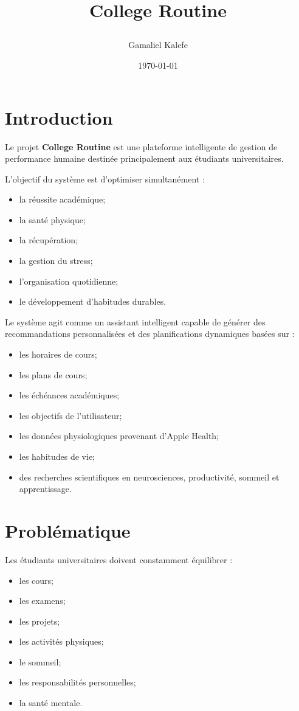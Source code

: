 \documentclass[12pt]{article}
\title{
    \Huge \textbf{College Routine} \\
    \vspace{0.5cm}
    
}
\author{Gamaliel Kalefe}
\date{\today}
\begin{document}
\maketitle
\newpage
\tableofcontents
\newpage

\section{Introduction}

Le projet \textbf{College Routine} est une plateforme intelligente de gestion de performance humaine destinée principalement aux étudiants universitaires.

L’objectif du système est d’optimiser simultanément :
\begin{itemize}
    \item la réussite académique;
    \item la santé physique;
    \item la récupération;
    \item la gestion du stress;
    \item l’organisation quotidienne;
    \item le développement d’habitudes durables.
\end{itemize}

Le système agit comme un assistant intelligent capable de générer des recommandations personnalisées et des planifications dynamiques basées sur :
\begin{itemize}
    \item les horaires de cours;
    \item les plans de cours;
    \item les échéances académiques;
    \item les objectifs de l’utilisateur;
    \item les données physiologiques provenant d’Apple Health;
    \item les habitudes de vie;
    \item des recherches scientifiques en neurosciences, productivité, sommeil et apprentissage.
\end{itemize}

\section{Problématique}

Les étudiants universitaires doivent constamment équilibrer :
\begin{itemize}
    \item les cours;
    \item les examens;
    \item les projets;
    \item les activités physiques;
    \item le sommeil;
    \item les responsabilités personnelles;
    \item la santé mentale.
\end{itemize}
\end{document}
